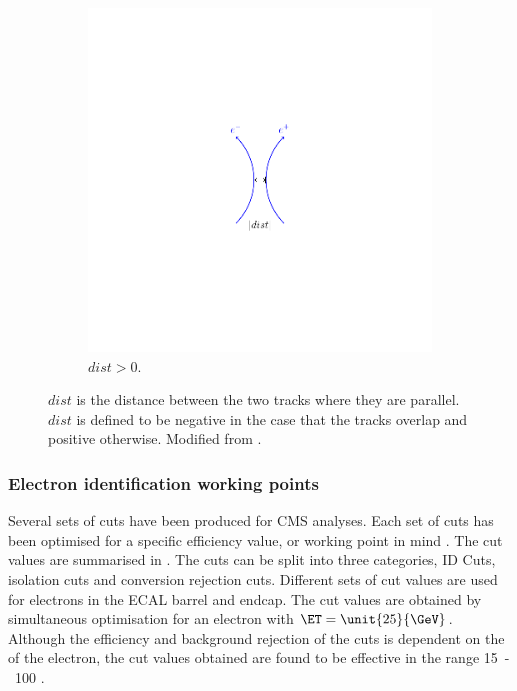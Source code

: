 \begin{figure}[htbp]
\begin{subfigure}{0.45\textwidth}
    \includegraphics[trim = 40mm 40mm 40mm 40mm, clip,width=\textwidth]{dist_p}
    \caption{$dist>0$.}
    \label{fig:dist_p}
  \end{subfigure}
  \caption[$dist$ is the distance between the two tracks where they are
parallel.]{$dist$ is the distance between the two tracks where they are
parallel. $dist$ is defined to be negative in the case that the tracks overlap
and positive otherwise. Modified from \cite{barge2009conversion}. } 
\label{fig:dist}
\end{figure}

\subsubsection{Electron identification working points}

Several sets of cuts have been produced for CMS analyses. Each set of cuts has
been optimised for a specific efficiency value, or working point in mind
\cite{nikos,daskalakis2009data,simplecutbasedeleid}.  The cut values are
summarised in . The cuts can be split into three
categories, ID Cuts, isolation cuts and conversion rejection cuts. Different
sets of cut values are used for electrons in the ECAL barrel and endcap. The cut
values are obtained by simultaneous optimisation for an electron with
$\ET=\unit{25}{\GeV}$. Although the efficiency and background rejection of the
cuts is dependent on the \ET of the electron, the cut values obtained are found
to be effective in the range \unit{15-100}{\GeV} \cite{nikos,daskalakis2009data}.

